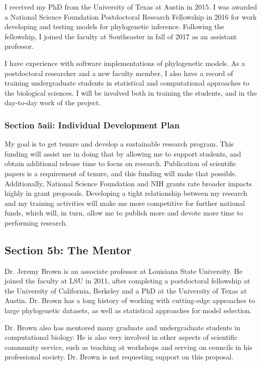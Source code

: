 \documentclass[]{article}
\begin{document}
I received my PhD from the University of Texas at Austin in 2015. 
I was awarded a National Science Foundation Postdoctoral Research Fellowship in 2016 for work developing and testing models for phylogenetic inference.
Following the fellowship, I joined the faculty at Southeaster in fall of 2017 as an assistant professor. \par
I have experience with software implementations of phylogenetic models.
As a postdoctoral researcher and a new faculty member, I also have a record of training undergraduate students in statistical and computational approaches to the biological sciences. 
I will be involved both in training the students, and in the day-to-day work of the project.
\subsubsection*{Section 5aii: Individual Development Plan}

My goal is to get tenure and develop a sustainable research program.
This funding will assist me in doing that by allowing me to support students, and obtain additional release time to focus on research.
Publication of scientific papers is a requirement of tenure, and this funding will make that possible.
Additionally, National Science Foundation and NIH grants rate broader impacts highly in grant proposals.
Developing a tight relationship between my research and my training activities will make me more competitive for further national funds, which will, in turn, allow me to publish more and devote more time to performing research. \par

\subsection*{Section 5b: The Mentor}

Dr. Jeremy Brown is an associate professor at Louisiana State University.
He joined the faculty at LSU in 2011, after completing a postdoctoral fellowship at the University of California, Berkeley and a PhD at the University of Texas at Austin.
Dr. Brown has a long history of working with cutting-edge approaches to large phylogenetic datasets, as well as statistical approaches for model selection. \par
Dr. Brown also has mentored many graduate and undergraduate students in computational biology.
He is also very involved in other aspects of scientific community service, such as teaching at workshops and serving on councils in his professional society.
Dr. Brown is not requesting support on this proposal.
\end{document}
